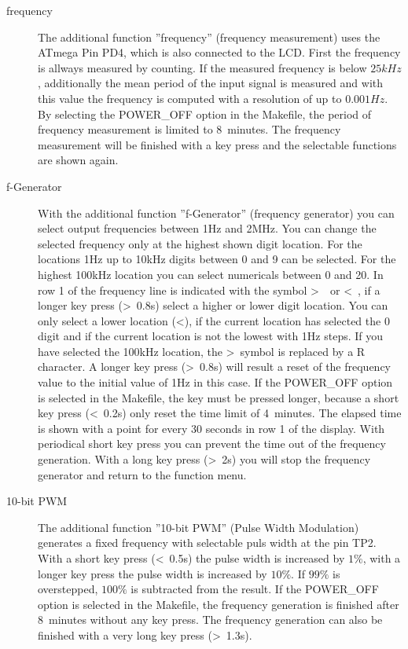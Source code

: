 \begin{description}
 \item[frequency]
The additional function ''frequency'' (frequency measurement) uses the ATmega Pin PD4, which is also connected to the LCD.
First the frequency is allways measured by counting.
If the measured frequency is below \(25kHz\), additionally the mean period of the input signal
is measured and with this value the frequency is computed with a resolution of up to \(0.001Hz\).
By selecting the POWER\_OFF option in the Makefile, the period of frequency measurement is limited to 8~minutes.
The frequency measurement will be finished with a key press and the selectable functions are shown again.\\

 \item[f-Generator]
With the additional function ''f-Generator'' (frequency generator) you can select output frequencies between 1Hz and 2MHz.
You can change the selected frequency only at the highest shown digit location. 
For the locations 1Hz up to 10kHz digits between 0 and 9 can be selected.
For the highest 100kHz location you can select numericals between 0 and 20.
In row 1 of the frequency line is indicated with the symbol \textgreater~~or \textless~, 
if a longer key press (\textgreater~0.8s) select a higher or lower digit location.
You can only select a lower location (\textless), if the current location has selected the 0 digit and 
if the current location is not the lowest with 1Hz steps.
If you have selected the 100kHz location, the \textgreater~symbol is replaced by a R character. 
A longer key press (\textgreater~0.8s) will result a reset of the frequency value to the initial value of 1Hz in this case.
If the POWER\_OFF option is selected in the Makefile, the key must be pressed longer, because a
short key press (\textless~0.2s) only reset the time limit of 4~minutes.
The elapsed time is shown with a point for every 30 seconds in row 1 of the display.
With periodical short key press you can prevent the time out of the frequency generation.
With a long key press (\textgreater~2s) you will stop the frequency generator and return to the function menu.\\

\item[10-bit PWM]
The additional function ''10-bit PWM'' (Pulse Width Modulation) generates a fixed frequency with selectable
puls width at the pin TP2.
With a short key press (\textless~0.5s) the pulse width is increased by \(1\%\), with a longer key press the pulse width
is increased by \(10\%\).
If \(99\%\) is overstepped, \(100\%\) is subtracted from the result.
If the POWER\_OFF option is selected in the Makefile, the frequency generation is finished after 8~minutes without any key press.
The frequency generation can also be finished with a very long key press (\textgreater~1.3s).\\


\end{description}
